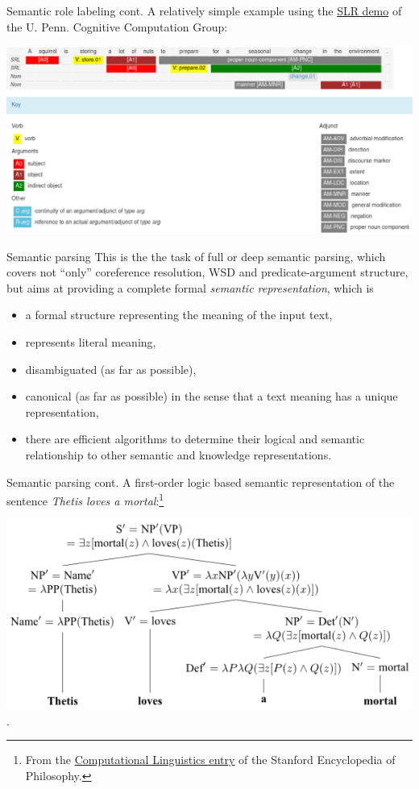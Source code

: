 \documentclass[style=upen, size=14pt]{powerdot}
\begin{document}
\begin{slide}[toc=]{Semantic role labeling cont.}
  A relatively simple example using the
  \href{https://cogcomp.seas.upenn.edu/page/demo_view/srl}{ SLR demo} of the U.
  Penn. Cognitive Computation Group:\bigskip
  
  \includegraphics[width=1.\textwidth]{slr.eps}
\end{slide}

\begin{slide}[toc=Semantic parsing]{Semantic parsing}
  This is the the task of full or deep semantic parsing, which covers not
  ``only'' coreference resolution, WSD and predicate-argument structure, but
  aims at providing a complete formal \emph{semantic representation}, which is
  \begin{itemize}
  \item a formal structure representing the meaning of the input text,
  \item represents literal meaning,
  \item disambiguated (as far as possible),
  \item canonical (as far as possible) in the sense that a text meaning has a
    unique representation,
  \item there are efficient algorithms to determine their logical and semantic
    relationship to other semantic and knowledge representations.
  \end{itemize}
\end{slide}

\begin{slide}[toc=]{Semantic parsing cont.}
  A first-order logic based semantic representation of the sentence \emph{Thetis
    loves a mortal}:\footnote{From the
    \href{https://plato.stanford.edu/entries/computational-linguistics/}{Computational
      Linguistics entry} of the Stanford Encyclopedia of Philosophy.}\bigskip

  \includegraphics[width=1.\textwidth]{semrep.eps}.
\end{slide}
\end{document}
